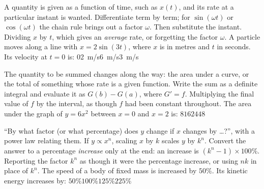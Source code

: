 {A quantity is given as a function of time, such as $x(t)$, and its rate at a particular instant is
wanted.}
{Differentiate term by term; for $\sin(\omega t)$ or $\cos(\omega t)$ the chain rule brings out a factor
$\omega$. Then substitute the instant.}
{Dividing $x$ by $t$, which gives an \emph{average} rate, or forgetting the factor $\omega$.}
{A particle moves along a line with $x=2\sin(3t)$, where $x$ is in metres and $t$ in seconds. Its
velocity at $t=0$ is:}
{$0$}{\SI{2}{m/s}}{\SI{6}{m/s}}{\SI{3}{m/s}}

{The quantity to be summed changes along the way: the area under a curve, or the total of something
whose rate is a given function.}
{Write the sum as a definite integral and evaluate it as $G(b)-G(a)$, where $G'=f$.}
{Multiplying the final value of $f$ by the interval, as though $f$ had been constant throughout.}
{The area under the graph of $y=6x^2$ between $x=0$ and $x=2$ is:}
{$8$}{$16$}{$24$}{$48$}

{``By what factor (or what percentage) does $y$ change if $x$ changes by \ldots?'', with a power law
relating them.}
{If $y\propto x^n$, scaling $x$ by $k$ scales $y$ by $k^n$. Convert the answer to a percentage
\emph{increase} only at the end: an increase is $(k^n-1)\times100\%$.}
{Reporting the factor $k^n$ as though it were the percentage increase, or using $nk$ in place of $k^n$.}
{The speed of a body of fixed mass is increased by $50\%$. Its kinetic energy increases by:}
{$50\%$}{$100\%$}{$125\%$}{$225\%$}
